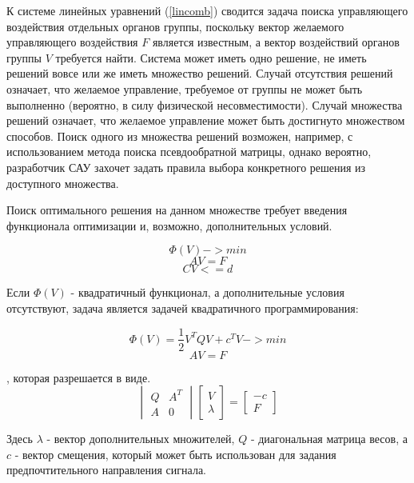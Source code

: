 К системе линейных уравнений (\ref{lincomb}) сводится задача поиска управляющего воздействия отдельных органов группы, поскольку вектор желаемого управляющего воздействия $F$ является известным, а вектор воздействий органов группы $V$ требуется найти. Система может иметь одно решение, не иметь решений вовсе или же иметь множество решений. Случай отсутствия решений означает, что желаемое управление, требуемое от группы не может быть выполненно (вероятно, в силу физической несовместимости). Случай множества решений означает, что желаемое управление может быть достигнуто множеством способов. Поиск одного из множества решений возможен, например, с использованием метода поиска псевдообратной матрицы, однако вероятно, разработчик САУ захочет задать правила выбора конкретного решения из доступного множества.

Поиск оптимального решения на данном множестве требует введения функционала оптимизации и, возможно, дополнительных условий.

\begin{equation}\Phi(V) -> min\end{equation}
\begin{equation}AV = F\end{equation}
\begin{equation}CV <= d\end{equation}

Если $\Phi(V)$ - квадратичный функционал, а дополнительные условия отсутствуют, задача
 является задачей квадратичного программирования:

\begin{equation}\Phi(V) = \frac{1}{2}V^TQV+c^TV -> min\end{equation}
\begin{equation}AV = F\end{equation}

, которая разрешается в виде.
\begin{equation} \label{slau}
\begin{vmatrix}
Q & A^T\\
A & 0
\end{vmatrix}
\begin{bmatrix}
V\\
\lambda
\end{bmatrix}
=
\begin{bmatrix}
-c\\
F
\end{bmatrix}
\end{equation}

Здесь $\lambda$ - вектор дополнительных множителей, $Q$ - диагональная матрица весов, а $c$ - вектор смещения, который может быть использован для задания предпочтительного направления сигнала. 


